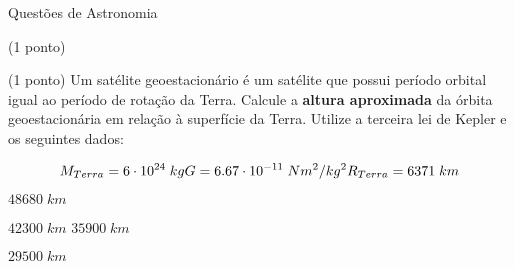 \documentclass{../lista}
\begin{document}
\begin{secao}{Questões de Astronomia}
\begin{questao}{(1 ponto)}
		\end{questao}
		\begin{questao}{(1 ponto)}
			Um satélite geoestacionário é um satélite que possui período orbital igual ao período de rotação da Terra. Calcule a \textbf{altura aproximada} da órbita geoestacionária em relação à superfície da Terra. Utilize a terceira lei de Kepler e os seguintes dados:
			
			\begin{equation}
				M_{Terra} = 6 \cdot 10^{24} \; kg \\
				G = 6.67 \cdot 10^{-11} \; N m^{2} / kg^{2} \\
				R_{Terra} = 6371 \; km
			\end{equation}
		
			
			\begin{alternativas}
				\item $48680 \; km$
				\item $42300 \; km$
				\alternativaMarcada $35900 \; km$
				\item $29500 \; km$
			\end{alternativas}
		\end{questao}
	\end{secao}
\end{document}

